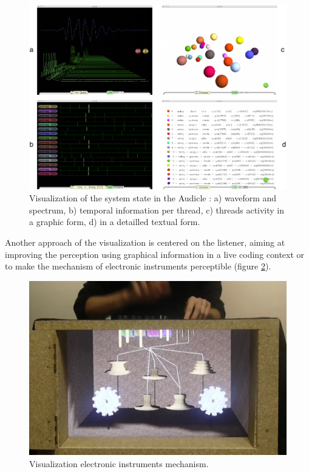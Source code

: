 \documentclass{article}
\begin{document}
\begin{figure}[h]
\begin{center}
	\includegraphics[width=0.9\columnwidth]{imgs/audicle}
\caption{Visualization of the system state in the Audicle : 
a) waveform and spectrum, b) temporal information per thread, 
c) threads activity in a graphic form, d) in a detailled textual form.}
\label{fig:audicle}
\end{center}
\end{figure}

Another approach of the visualization is centered on the listener, aiming at improving the perception using graphical information in a live coding context \cite{McLean:2010:VLC:2227180.2227185} or to make the mechanism of electronic instruments perceptible \cite{berthaut13} (figure \ref{fig:rouages}).

\begin{figure}[h]
\begin{center}
	\includegraphics[width=0.8\columnwidth]{imgs/rouages}
\caption{Visualization electronic instruments mechanism.}
\label{fig:rouages}
\end{center}
\end{figure}
\end{document}
